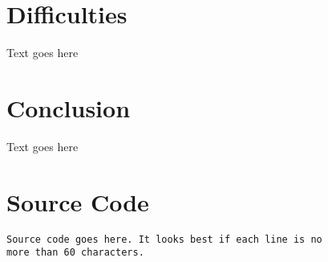\documentclass[12pt,letterpaper]{article}
\begin{document}
\begin{enumerate}
\end{enumerate}

\section{Difficulties}
Text goes here

\section{Conclusion}
Text goes here

\section{Source Code}
\begin{verbatim}
Source code goes here. It looks best if each line is no
more than 60 characters.
\end{verbatim}
\end{document}
